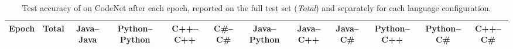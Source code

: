 \begin{table}[!htbp]
\centering
\caption{Test accuracy of \method{} on CodeNet after each epoch, reported on the full test set (\emph{Total}) and separately for each language configuration.}
\label{tab:d2_epochs}

\tiny
\setlength{\tabcolsep}{3.2pt}
\renewcommand{\arraystretch}{1.5}

\begin{tabular}{|c*{11}{c}|}
\hline
\textbf{Epoch}
& \textbf{Total}
& \textbf{Java--Java}
& \textbf{Python--Python}
& \textbf{C++--C++}
& \textbf{C\#--C\#}
& \textbf{Java--Python}
& \textbf{Java--C++}
& \textbf{Java--C\#}
& \textbf{Python--C++}
& \textbf{Python--C\#}
& \textbf{C++--C\#}
\\
\hline


\end{tabular}
\end{table}
